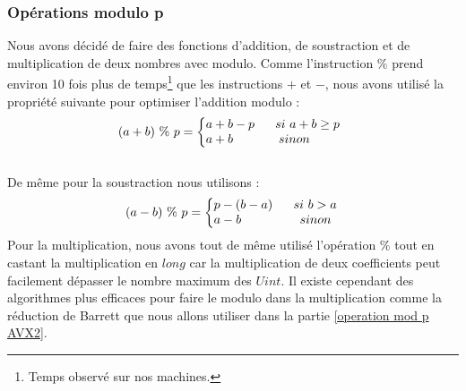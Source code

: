\documentclass[12pt, a4paper]{article}
\begin{document}
\subsubsection{Opérations modulo p}
\label{operation mod p}
Nous avons décidé de faire des fonctions d'addition, de soustraction et de multiplication de deux nombres avec modulo. Comme l'instruction $\%$ prend environ 10 fois plus de temps\footnote{Temps observé sur nos machines.} que les instructions $+$ et $-$, nous avons utilisé la propriété suivante pour optimiser l'addition modulo : \\
\[ (a+b)\ \%\ p = 
\left\{\begin{array}{@{}l@{}}
a + b - p\ \ \ \ \ si\ a+b \geq p\\
a + b\ \ \ \ \ \ \ \ \ \ \ sinon
\end{array}\right.\,\ \] \\
De même pour la soustraction nous utilisons :
\[ (a-b)\ \%\ p = 
\left\{\begin{array}{@{}l@{}}
p - (b - a)\ \ \ \ \ si\ b > a\\
a - b\ \ \ \ \ \ \ \ \ \ \ \ \ \ sinon
\end{array}\right.\,\]
\indent Pour la multiplication, nous avons tout de même utilisé l'opération $\%$ tout en castant la multiplication en $long$ car la multiplication de deux coefficients peut facilement dépasser le nombre maximum des $Uint$. Il existe cependant des algorithmes plus efficaces pour faire le modulo dans la multiplication comme la réduction de Barrett que nous allons utiliser dans la partie \ref{operation mod p AVX2}.
\end{document}
